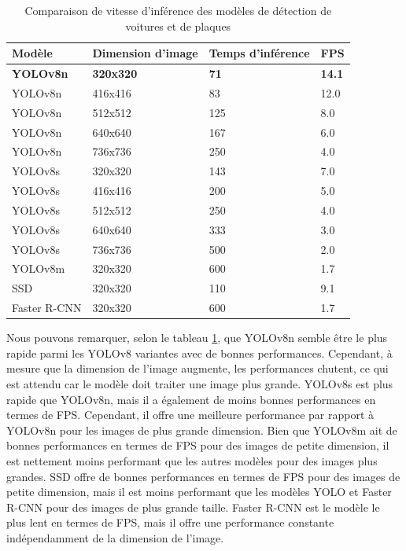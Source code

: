 \begin{table}[H]
    \centering
    \begin{tabular}{|l|l|l|l|}
    \hline
        Modèle & Dimension d'image & Temps d'inférence & FPS\\ \hline
        \textbf{YOLOv8n} & \textbf{320x320} & \textbf{71} & \textbf{14.1} \\ \hline
        YOLOv8n & 416x416 & 83 & 12.0 \\ \hline
        YOLOv8n & 512x512 & 125 & 8.0 \\ \hline
        YOLOv8n & 640x640 & 167 & 6.0 \\ \hline
        YOLOv8n & 736x736 & 250 & 4.0 \\ \hline
        YOLOv8s & 320x320 & 143 & 7.0 \\ \hline
        YOLOv8s & 416x416 & 200 & 5.0 \\ \hline
        YOLOv8s & 512x512 & 250 & 4.0 \\ \hline
        YOLOv8s & 640x640 & 333 & 3.0 \\ \hline
        YOLOv8s & 736x736 & 500 & 2.0 \\ \hline
        YOLOv8m & 320x320 & 600 & 1.7 \\ \hline
        SSD & 320x320 & 110 & 9.1 \\ \hline
        Faster R-CNN & 320x320 & 600 & 1.7 \\ \hline
    \end{tabular}
    \caption{Comparaison de vitesse d'inférence des modèles de détection de voitures et de plaques }
    \label{table:ch4-test_speed_car_allmodels}
\end{table}

Nous pouvons remarquer, selon le tableau \ref {table:ch4-test_speed_car_allmodels}, que YOLOv8n  semble être le plus rapide parmi les YOLOv8 variantes avec de bonnes performances. Cependant, à mesure que la dimension de l'image augmente, les performances chutent, ce qui est attendu car le modèle doit traiter une image plus grande. YOLOv8s  est plus rapide que YOLOv8n, mais il a également de moins bonnes performances en termes de FPS. Cependant, il offre une meilleure performance par rapport à YOLOv8n pour les images de plus grande dimension. Bien que YOLOv8m ait de bonnes performances en termes de FPS pour des images de petite dimension, il est nettement moins performant que les autres modèles pour des images plus grandes. SSD offre de bonnes performances en termes de FPS pour des images de petite dimension, mais il est moins performant que les modèles YOLO et Faster R-CNN pour des images de plus grande taille. Faster R-CNN est le modèle le plus lent en termes de FPS, mais il offre une performance constante indépendamment de la dimension de l'image.

